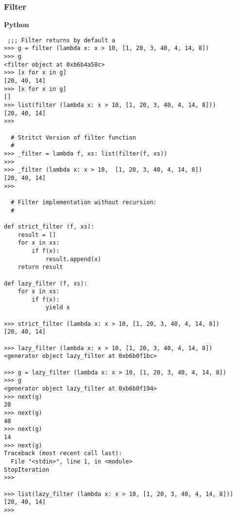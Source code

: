 \documentclass[11pt]{article}
\begin{document}
\subsubsection{Filter}
\label{sec-1-9-3}

\textbf{Python}

\begin{verbatim}
 ;;; Filter returns by default a 
>>> g = filter (lambda x: x > 10, [1, 20, 3, 40, 4, 14, 8])
>>> g
<filter object at 0xb6b4a58c>
>>> [x for x in g]
[20, 40, 14]
>>> [x for x in g]
[]
>>> list(filter (lambda x: x > 10, [1, 20, 3, 40, 4, 14, 8]))
[20, 40, 14]
>>> 

  # Stritct Version of filter function
  #
>>> _filter = lambda f, xs: list(filter(f, xs))
>>> 
>>> _filter (lambda x: x > 10,  [1, 20, 3, 40, 4, 14, 8])
[20, 40, 14]
>>> 

  # Filter implementation without recursion:
  #

def strict_filter (f, xs):
    result = []
    for x in xs:
        if f(x):
            result.append(x)
    return result

def lazy_filter (f, xs):
    for x in xs:
        if f(x):
            yield x

>>> strict_filter (lambda x: x > 10, [1, 20, 3, 40, 4, 14, 8])
[20, 40, 14]

>>> lazy_filter (lambda x: x > 10, [1, 20, 3, 40, 4, 14, 8])
<generator object lazy_filter at 0xb6b0f1bc>

>>> g = lazy_filter (lambda x: x > 10, [1, 20, 3, 40, 4, 14, 8])
>>> g
<generator object lazy_filter at 0xb6b0f194>
>>> next(g)
20
>>> next(g)
40
>>> next(g)
14
>>> next(g)
Traceback (most recent call last):
  File "<stdin>", line 1, in <module>
StopIteration
>>> 

>>> list(lazy_filter (lambda x: x > 10, [1, 20, 3, 40, 4, 14, 8]))
[20, 40, 14]
>>>
\end{verbatim}
\end{document}
